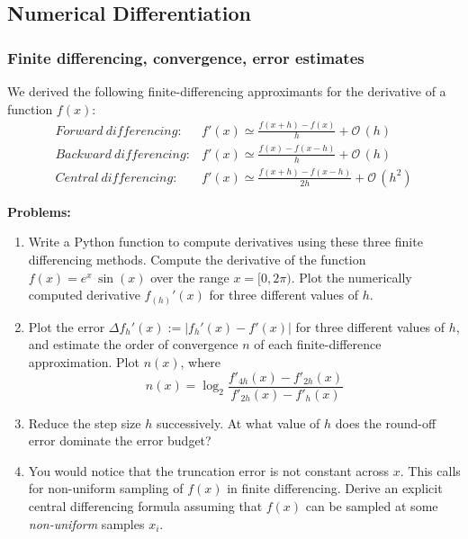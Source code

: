 \subsection{Numerical Differentiation}
\label{ssec:diff}

\subsubsection{Finite differencing, convergence, error estimates}

We derived the following finite-differencing approximants for the derivative of a function $f(x)$: 
\begin{eqnarray}
\mathit{Forward~differencing:} & f'(x) \simeq \frac{f(x+h)-f(x)}{h} + \mathcal{O}\,(h) \\
\mathit{Backward~differencing:} & f'(x) \simeq \frac{f(x)-f(x-h)}{h} + \mathcal{O}\,(h) \\
\mathit{Central~differencing:} & f'(x) \simeq \frac{f(x+h)-f(x-h)}{2h} + \mathcal{O}\,(h^2)
\end{eqnarray}


\textbf{Problems:}
\begin{enumerate}
\item Write a Python function to compute derivatives using these three finite differencing methods. Compute the derivative of the function $f(x) = e^x \, \sin(x)$ over the range $x = [0, 2\pi)$. Plot the numerically computed derivative $f_{(h)}'(x)$ for three different values of $h$. 
\item Plot the error $\Delta f_{h}'(x) := |f_{h}'(x) - f'(x)|$ for three different values of $h$, and estimate the order of convergence $n$ of each finite-difference approximation. Plot $n(x)$, where 
\begin{equation}
n(x) = \log_2 \frac{f'_{4h}(x) - f'_{2h}(x)}{f'_{2h}(x) - f'_{h}(x)}
\label{eq:order_convg}
\end{equation}
\item Reduce the step size $h$ successively. At what value of $h$ does the round-off error dominate the error budget? 
\item You would notice that the truncation error is not constant across $x$. This calls for non-uniform sampling of $f(x)$ in finite differencing. Derive an explicit central differencing formula assuming that $f(x)$ can be sampled at some \emph{non-uniform} samples $x_i$. 
\end{enumerate}

